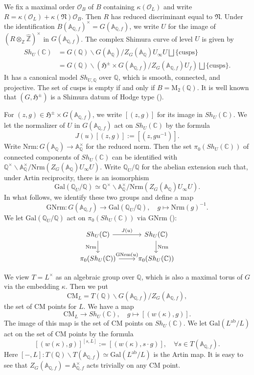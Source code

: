 \documentclass[11pt,oneside,reqno]{amsart}
\newcommand{\Gal}{\mathrm{Gal}}
\newcommand{\GNrm}{\mathrm{GNrm}}
\newcommand{\ab}{\mathrm{ab}}
\newcommand{\Nrm}{\mathrm{Nrm}}
\newcommand{\CM}{\mathrm{CM}}
\newcommand{\A}{\mathbb{A}}
\newcommand{\C}{\mathbb{C}}
\newcommand{\Q}{\mathbb{Q}}
\newcommand{\Z}{\mathbb{Z}}
\newcommand{\Ocal}{\mathcal{O}}
\newcommand{\Hfrak}{\mathfrak{H}}
\newcommand{\Nfrak}{\mathfrak{N}}
\theoremstyle{plain}
\begin{document}
	
	We fix a maximal order $\Ocal_B$ of $B$ containing $\kappa(\Ocal_L)$ and write $R=\kappa(\Ocal_L)+\kappa(\Nfrak)\Ocal_B$. Then $R$ has reduced discriminant equal to $\Nfrak$. Under the identification $B(\A_{\Q,f})^\times= G(\A_{\Q,f})$, we write $U$ for the image of $(R\otimes_\Z\widehat{\Z})^\times$ in $ G(\A_{\Q,f})$. The complex Shimura curve of level $U$ is given by
	\begin{align*}
		Sh_U(\C)
		&
		=
		G(\Q)\backslash  G(\A_\Q)/Z_ G(\A_\Q)U_\infty U
		\bigsqcup\{\text{cusps}\}
		\\
		&
		=
		G(\Q)\backslash
		\left(
		\Hfrak^\pm\times  G(\A_{\Q,f})/Z_ G(\A_{\Q,f})U_f
		\right)
		\bigsqcup\{\text{cusps}\}.
	\end{align*}
	It has a canonical model $ Sh_{U,\Q}$ over $\Q$, which is smooth, connected, and projective. The set of cusps is empty if and only if $B=\mathrm{M}_2(\Q)$. It is well known that $(G,\Hfrak^\pm)$ is a Shimura datum of Hodge type (\cite{Mumford1969}).
	
	
	
	
	
	
	
	
	
	
	
	
	For $(z,g)\in\Hfrak^\pm\times G(\A_{\Q,f})$, we write $[(z,g)]$ for its image in $Sh_{U}(\C)$. We let the normalizer of $U$ in $G(\A_{\Q,f})$ act on $Sh_{U}(\C)$ by the formula
	\[
	J(u)[(z,g)]:=[(z,gu^{-1})].
	\]
	Write $\Nrm\colon G(\A_\Q)\to\A_\Q^\times$ for the reduced norm. Then the set $\pi_0(Sh_{U}(\C))$ of connected components of $Sh_{U}(\C)$ can be identified with $\Q^\times\backslash\A_\Q^\times/\Nrm(Z_ G(\A_\Q)U_\infty U)$. Write $\Q_U/\Q$ for the abelian extension such that, under Artin reciprocity, there is an isomorphism
	\[
	\Gal(\Q_U/\Q)\simeq
	\Q^\times\backslash\A_\Q^\times/\Nrm(Z_ G(\A_\Q)U_\infty U).
	\]
	In what follows, we identify these two groups and define a map
	\[
	\GNrm\colon
	G(\A_{\Q,f})\to\Gal(\Q_U/\Q),
	\quad
	g\mapsto\Nrm(g)^{-1}.
	\]
	We let $\Gal(\Q_U/\Q)$ act on $\pi_0(Sh_{U}(\C))$ via $\GNrm$ (\cite[§1.2]{Howard2004b}):
	\[
	\begin{tikzcd}
		Sh_{U}(\C)
		\arrow[r,"J(u)"]
		\arrow[d,"\Nrm"']
		&
		Sh_{U}(\C)
		\arrow[d,"\Nrm"]
		\\
		\pi_0( Sh_{U}(\C))
		\arrow[r,"\GNrm(u)"]
		&
		\pi_0( Sh_{U}(\C))
	\end{tikzcd}
	\]
	
	
	We view $T=L^\times$ as an algebraic group over $\Q$, which is also a maximal torus of $G$ via the embedding $\kappa$. Then we put
	\[
	\CM_L=T(\Q)\backslash G(\A_{\Q,f})/Z_ G(\A_{\Q,f}),
	\]
	the set of CM points for $L$. We have a map
	\[
	\CM_L\to Sh_{U}(\C),
	\quad
	g\mapsto[(w(\kappa),g)].
	\]
	The image of this map is the set of CM points on $Sh_{U}(\C)$. We let $\Gal(L^\ab/L)$ act on the set of CM points by the formula
	\begin{equation}\label{Gal(L^ab/L) acts on CM_L}
		[(w(\kappa),g)]^{[s,L]}:=[(w(\kappa),s\cdot g)],
		\quad
		\forall
		s\in T(\A_{\Q,f}).
	\end{equation}
	Here $[-,L]\colon T(\Q)\backslash T(\A_{\Q,f})\simeq\Gal(L^\ab/L)$ is the Artin map. It is easy to see that $Z_ G(\A_{\Q,f})=\A_{\Q,f}^\times$ acts trivially on any CM point.
	
\end{document}
